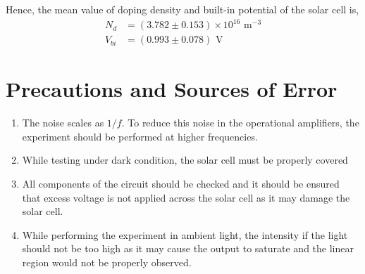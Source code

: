 Hence, the mean value of doping density and built-in potential of the solar cell is,
\begin{align*}
    N_d &= (3.782 \pm 0.153)  \times 10^{16} \text{ m}^{-3}\\
    V_{bi} &= (0.993 \pm 0.078) \text{ V}
\end{align*}

\section{Precautions and Sources of Error}

    \begin{enumerate}
        \item The noise scales as $1/f$.
        To reduce this noise
        in the operational amplifiers, the experiment
        should be performed at higher frequencies.
        \item While testing under dark condition, the solar
        cell must be properly covered
        \item All components of the circuit should be checked
        and it should be ensured that excess voltage is
        not applied across the solar cell as it may damage the solar cell.
        \item While performing the experiment in ambient
        light, the intensity if the light should not be
        too high as it may cause the output to saturate
        and the linear region would not be properly observed.
    \end{enumerate}